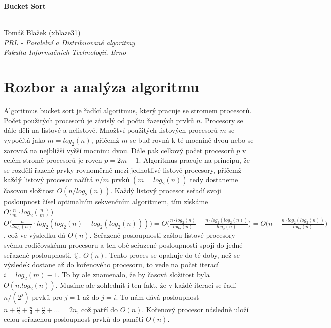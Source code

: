 \documentclass[12pt, a4paper]{article}
\begin{document}
\begin{center}
	\begin{huge}\textbf{Bucket Sort}\end{huge} \\
	\vspace{0.4cm}
	Tomáš Blažek (xblaze31) \\
	\textit{PRL - Paralelní a Distribuované algoritmy} \\
	\textit{Fakulta Informačních Technologií, Brno} \\
\end{center}



\section{Rozbor a analýza algoritmu}
\label{sec:rozbor}
Algoritmus bucket sort je řadící algoritmus, který pracuje se stromem procesorů. Počet použitých procesorů je závislý od počtu řazených prvků $n$. Procesory se dále dělí na listové a nelistové. Množtví použitých listových procesorů $m$ se vypočítá jako $m=log_{2}(n)$, přičemž $m$ se buď rovná k-té mocnině dvou nebo se zarovná na nejbližší vyšší mocninu dvou. Dále pak celkový počet procesorů $p$ v celém stromě procesorů je roven $p = 2m-1$. Algoritmus pracuje na principu, že se rozdělí řazené prvky rovnoměrně mezi jednotlivé listové procesory, přičemž každý listový procesor načítá $n/m$ prvků $(m=log_{2}(n))$ tedy dostaneme časovou složitost $O(n/log_{2}(n))$. Každý listový procesor seřadí svoji posloupnost čísel optimalním sekvenčním algoritmem, tím získáme $O\big(\frac{n}{m}\cdot log_{2}(\frac{n}{m})\big)$ = $O\big(\frac{n}{log_{2}(n)}\cdot log_{2}(log_{2}(n)-log_{2}(log_{2}(n)))\big) = O\big(\frac{n\cdot log_{2}(n)}{log_{2}(n)}-\frac{n\cdot log_{2}(log_{2}(n))}{log_{2}(n)}\big) = O\big(n-\frac{n\cdot log_{2}(log_{2}(n))}{log_{2}(n)}\big)$, což ve výsledku dá $O(n)$. Seřazené posloupnosti zašlou listové procesory svému rodičovskému procesoru a ten obě seřazené posloupnosti spojí do jedné seřazené posloupnosti, tj. $O(n)$. Tento proces se opakuje do té doby, než se výsledek dostane až do kořenového procesoru, to vede na počet iterací  $i = log_{2}(m)-1$. To by ale znamenalo, že by časová složitost byla $O(n.log_{2}(n))$. Musíme ale zohlednit i ten fakt, že v každé iteraci se řadí $n/(2^j)$ prvků pro $j = 1$ až do $j = i$. To nám dává posloupnost $n + \frac{n}{2} + \frac{n}{4} +\frac{n}{8} + ... = 2n$, což patří do $O(n)$. Kořenový procesor následně uloží celou seřazenou posloupnost prvků do paměti $O(n)$. 
\end{document}

